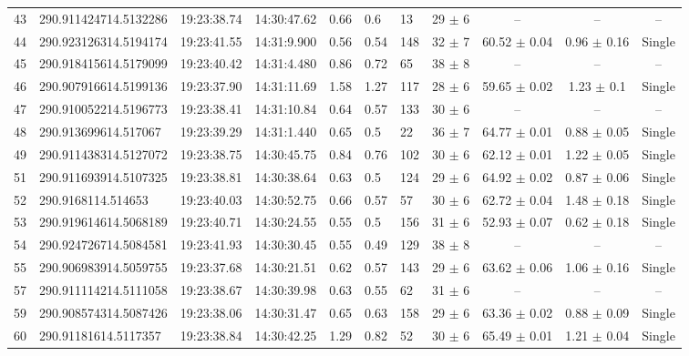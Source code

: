 \documentclass[longauth]{aa} %
\begin{document}
\begin{appendix}
\begin{table}[htbp!]
\begin{tabular}{llllllllccc}
43  &  290.911424714.5132286  &  19:23:38.74  &  14:30:47.62  &  0.66  &  0.6  &  13  &  29 $\pm$ 6  &  --  &  --  &  -- \\
44  &  290.923126314.5194174  &  19:23:41.55  &  14:31:9.900  &  0.56  &  0.54  &  148  &  32 $\pm$ 7  &  60.52 $\pm$ 0.04  &  0.96 $\pm$ 0.16  &  Single \\
45  &  290.918415614.5179099  &  19:23:40.42  &  14:31:4.480  &  0.86  &  0.72  &  65  &  38 $\pm$ 8  &  --  &  --  &  -- \\
46  &  290.907916614.5199136  &  19:23:37.90  &  14:31:11.69  &  1.58  &  1.27  &  117  &  28 $\pm$ 6  &  59.65 $\pm$ 0.02  &  1.23 $\pm$ 0.1  &  Single \\
47  &  290.910052214.5196773  &  19:23:38.41  &  14:31:10.84  &  0.64  &  0.57  &  133  &  30 $\pm$ 6  &  --  &  --  &  -- \\
48  &  290.913699614.517067  &  19:23:39.29  &  14:31:1.440  &  0.65  &  0.5  &  22  &  36 $\pm$ 7  &  64.77 $\pm$ 0.01  &  0.88 $\pm$ 0.05  &  Single \\
49  &  290.911438314.5127072  &  19:23:38.75  &  14:30:45.75  &  0.84  &  0.76  &  102  &  30 $\pm$ 6  &  62.12 $\pm$ 0.01  &  1.22 $\pm$ 0.05  &  Single \\
51  &  290.911693914.5107325  &  19:23:38.81  &  14:30:38.64  &  0.63  &  0.5  &  124  &  29 $\pm$ 6  &  64.92 $\pm$ 0.02  &  0.87 $\pm$ 0.06  &  Single \\
52  &  290.9168114.514653  &  19:23:40.03  &  14:30:52.75  &  0.66  &  0.57  &  57  &  30 $\pm$ 6  &  62.72 $\pm$ 0.04  &  1.48 $\pm$ 0.18  &  Single \\
53  &  290.919614614.5068189  &  19:23:40.71  &  14:30:24.55  &  0.55  &  0.5  &  156  &  31 $\pm$ 6  &  52.93 $\pm$ 0.07  &  0.62 $\pm$ 0.18  &  Single \\
54  &  290.924726714.5084581  &  19:23:41.93  &  14:30:30.45  &  0.55  &  0.49  &  129  &  38 $\pm$ 8  &  --  &  --  &  -- \\
55  &  290.906983914.5059755  &  19:23:37.68  &  14:30:21.51  &  0.62  &  0.57  &  143  &  29 $\pm$ 6  &  63.62 $\pm$ 0.06  &  1.06 $\pm$ 0.16  &  Single \\
57  &  290.911114214.5111058  &  19:23:38.67  &  14:30:39.98  &  0.63  &  0.55  &  62  &  31 $\pm$ 6  &  --  &  --  &  -- \\
59  &  290.908574314.5087426  &  19:23:38.06  &  14:30:31.47  &  0.65  &  0.63  &  158  &  29 $\pm$ 6  &  63.36 $\pm$ 0.02  &  0.88 $\pm$ 0.09  &  Single \\
60  &  290.91181614.5117357  &  19:23:38.84  &  14:30:42.25  &  1.29  &  0.82  &  52  &  30 $\pm$ 6  &  65.49 $\pm$ 0.01  &  1.21 $\pm$ 0.04  &  Single \\

\end{tabular}
\end{table}
\end{appendix}
\end{document}
